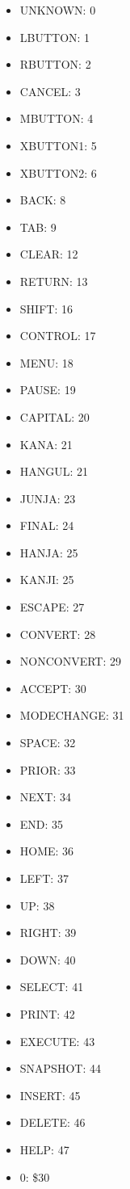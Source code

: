 \documentclass[a4paper]{report}
\begin{document}
\begin{itemize}
\item   UNKNOWN: 0
\item   LBUTTON: 1
\item   RBUTTON: 2
\item   CANCEL: 3
\item   MBUTTON: 4
\item   XBUTTON1: 5
\item   XBUTTON2: 6
\item   BACK: 8
\item   TAB: 9
\item   CLEAR: 12
\item   RETURN: 13
\item   SHIFT: 16
\item   CONTROL: 17
\item   MENU: 18
\item   PAUSE: 19
\item   CAPITAL: 20
\item   KANA: 21
\item   HANGUL: 21
\item   JUNJA: 23
\item   FINAL: 24
\item   HANJA: 25
\item   KANJI: 25
\item   ESCAPE: 27
\item   CONVERT: 28
\item   NONCONVERT: 29
\item   ACCEPT: 30
\item   MODECHANGE: 31
\item   SPACE: 32
\item   PRIOR: 33
\item   NEXT: 34
\item   END: 35
\item   HOME: 36
\item   LEFT: 37
\item   UP: 38
\item   RIGHT: 39
\item   DOWN: 40
\item   SELECT: 41
\item   PRINT: 42
\item   EXECUTE: 43
\item   SNAPSHOT: 44
\item   INSERT: 45
\item   DELETE: 46
\item   HELP: 47
\item   0: \$30

\end{itemize}
\end{document}
